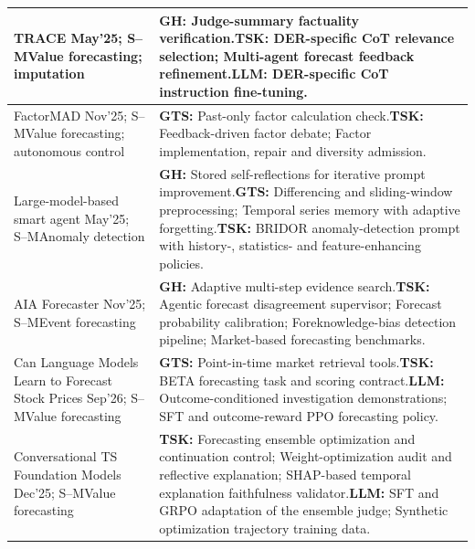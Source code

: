 \documentclass[preprints,article,submit,moreauthors]{Definitions/mdpi}
\newcommand{\typeSMshort}{\textsf{S--M}}
\begin{document}
\begin{longtable}{@{}>{\raggedright\arraybackslash}p{}p{}@{}}
TRACE \citep{chen2025trace} May'25; \typeSMshort{}\newline Value forecasting; imputation & \textbf{GH:} Judge-summary factuality verification.\newline\textbf{TSK:} DER-specific CoT relevance selection; Multi-agent forecast feedback refinement.\newline\textbf{LLM:} DER-specific CoT instruction fine-tuning.\\\midrule
FactorMAD \citep{duan2025factormad} Nov'25; \typeSMshort{}\newline Value forecasting; autonomous control & \textbf{GTS:} Past-only factor calculation check.\newline\textbf{TSK:} Feedback-driven factor debate; Factor implementation, repair and diversity admission.\\\midrule
Large-model-based smart agent \citep{wang2026large} May'25; \typeSMshort{}\newline Anomaly detection & \textbf{GH:} Stored self-reflections for iterative prompt improvement.\newline\textbf{GTS:} Differencing and sliding-window preprocessing; Temporal series memory with adaptive forgetting.\newline\textbf{TSK:} BRIDOR anomaly-detection prompt with history-, statistics- and feature-enhancing policies.\\\midrule
AIA Forecaster \citep{aiaforecaster2025} Nov'25; \typeSMshort{}\newline Event forecasting & \textbf{GH:} Adaptive multi-step evidence search.\newline\textbf{TSK:} Agentic forecast disagreement supervisor; Forecast probability calibration; Foreknowledge-bias detection pipeline; Market-based forecasting benchmarks.\\\midrule
Can Language Models Learn to Forecast Stock Prices \citep{auraforecaster2026} Sep'26; \typeSMshort{}\newline Value forecasting & \textbf{GTS:} Point-in-time market retrieval tools.\newline\textbf{TSK:} BETA forecasting task and scoring contract.\newline\textbf{LLM:} Outcome-conditioned investigation demonstrations; SFT and outcome-reward PPO forecasting policy.\\\midrule
Conversational TS Foundation Models \citep{conversationaltsfm2025} Dec'25; \typeSMshort{}\newline Value forecasting & \textbf{TSK:} Forecasting ensemble optimization and continuation control; Weight-optimization audit and reflective explanation; SHAP-based temporal explanation faithfulness validator.\newline\textbf{LLM:} SFT and GRPO adaptation of the ensemble judge; Synthetic optimization trajectory training data.\\\midrule

\end{longtable}
\end{document}
